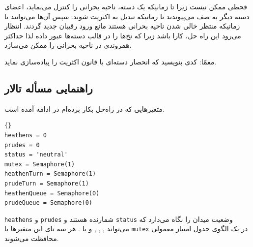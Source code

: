 \documentclass{book}
\newcommand{\clearemptydoublepage}{\newpage\cleardoublepage}
\begin{document}
    قحطی ممکن نیست زیرا تا زمانیکه یک دسته، ناحیه بحرانی را کنترل می‌نماید، اعضای دسته دیگر به صف می‌پیوندند تا زمانیکه 
    تبدیل به اکثریت شوند. سپس آن‌ها می‌توانند تا زمانیکه منتظر خالی شدن ناحیه بحرانی هستند مانع ورود رقیبان جدید گردند.
    انتظار می‌رود این راه حل، کارا باشد زیرا  که نخ‌ها را در قالب دسته‌ها عبور داده لذا حداکثر همروندی در 
    ناحیه بحرانی را ممکن می‌سازد. 

    معمّا: کدی بنویسید که انحصار دسته‌ای با قانون اکثریت را پیاده‌سازی نماید. 



\clearemptydoublepage
\subsection{راهنمایی مسأله تالار  }

    متغیرهایی که در راه‌حل بکار برده‌ام در ادامه آمده است. 

\begin{latin}
\begin{lstlisting}[title=\rl{راهنمایی مسأله تالار \lr{Modus}}]{}
heathens = 0
prudes = 0
status = 'neutral'
mutex = Semaphore(1)
heathenTurn = Semaphore(1)
prudeTurn = Semaphore(1)
heathenQueue = Semaphore(0)
prudeQueue = Semaphore(0)
\end{lstlisting}
\end{latin}

    {\tt heathens} و {\tt prudes} 
    شمارنده هستند و  {\tt status} وضعیت میدان را نگاه می‌دارد که می‌تواند 
    , ,
    ,  و یا . 
    هر سه تای این متغیرها با {\tt mutex} در یک الگوی جدول امتیاز معمولی محافظت می‌شوند. 
    
\end{document}

